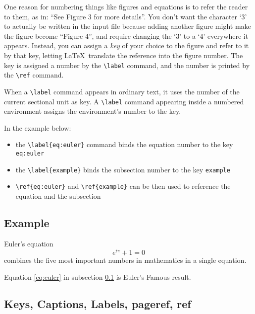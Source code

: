 \documentclass{article}
\newcommand{\justtext}[1]{\texttt{\textbackslash #1}}
\begin{document}
One reason for numbering things like figures and equations is to refer the reader to them, as in:
``See Figure 3 for more details''. You don't want the character `3' to actually be written in the
input file because adding another figure might make the figure become ``Figure 4'', and require
changing the `3' to a `4' everywhere it appears. Instead, you can assign a \emph{key} of your
choice to the figure and refer to it by that key, letting \LaTeX\ translate the reference into the
figure number. 
The key is assigned a number by the \justtext{label} command, and 
the number is printed by the \justtext{ref} command.

When a \justtext{label} command appears in ordinary text, it uses the number of the current
sectional unit as key. A \justtext{label} command appearing inside a numbered environment assigns
the environment's number to the key.

In the example below:

\begin{itemize}
   \item the \justtext{label\{eq:euler\}} command binds the equation number to the key
    {\tt eq:euler} 
   
   \item the \justtext{label\{example\}} binds the subsection number to the key
    {\tt example}
    
   \item \justtext{ref\{eq:euler\}} and \justtext{ref\{example\}} can be then used to reference the
    equation and the subsection
\end{itemize}

\subsection{Example}\label{example}

Euler's equation
\begin{equation}
   e^{i\pi} + 1 = 0 \label{eq:euler}
\end{equation}
combines the five most important numbers in mathematics in a single equation.

Equation \ref{eq:euler} in subsection \ref{example} is Euler's Famous result. 


\subsection{Keys, Captions, Labels, pageref, ref}
\end{document}
